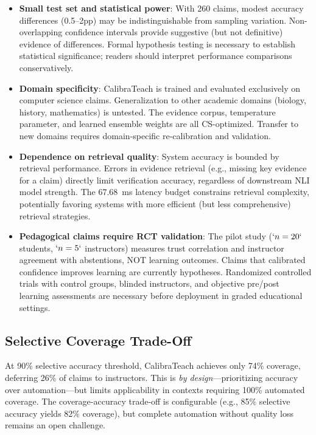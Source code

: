 \begin{itemize}
\item
  \textbf{Small test set and statistical power}: With 260 claims, modest accuracy differences (0.5--2pp) may be indistinguishable from sampling variation. Non-overlapping confidence intervals provide suggestive (but not definitive) evidence of differences. Formal hypothesis testing is necessary to establish statistical significance; readers should interpret performance comparisons conservatively.
\item
  \textbf{Domain specificity}: CalibraTeach is trained and evaluated exclusively on computer science claims. Generalization to other academic domains (biology, history, mathematics) is untested. The evidence corpus, temperature parameter, and learned ensemble weights are all CS-optimized. Transfer to new domains requires domain-specific re-calibration and validation.
\item
  \textbf{Dependence on retrieval quality}: System accuracy is bounded by retrieval performance. Errors in evidence retrieval (e.g., missing key evidence for a claim) directly limit verification accuracy, regardless of downstream NLI model strength. The 67.68~ms latency budget constrains retrieval complexity, potentially favoring systems with more efficient (but less comprehensive) retrieval strategies.
\item
  \textbf{Pedagogical claims require RCT validation}: The pilot study (\(`n=20`\) students, \(`n=5`\) instructors) measures trust correlation and instructor agreement with abstentions, NOT learning outcomes. Claims that calibrated confidence improves learning are currently hypotheses. Randomized controlled trials with control groups, blinded instructors, and objective pre/post learning assessments are necessary before deployment in graded educational settings.
\end{itemize}

\subsection{Selective Coverage Trade-Off}\label{selective-coverage-trade-off}

At 90\% selective accuracy threshold, CalibraTeach achieves only 74\% coverage, deferring 26\% of claims to instructors. This is \emph{by design}---prioritizing accuracy over automation---but limits applicability in contexts requiring 100\% automated coverage. The coverage-accuracy trade-off is configurable (e.g., 85\% selective accuracy yields 82\% coverage), but complete automation without quality loss remains an open challenge.

